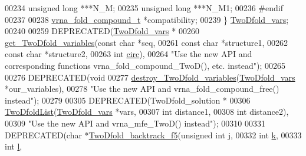 \begin{DoxyCode}
00234   \textcolor{keywordtype}{unsigned} \textcolor{keywordtype}{long}         ***N\_M;
00235   \textcolor{keywordtype}{unsigned} \textcolor{keywordtype}{long}         ***N\_M1;
00236 \textcolor{preprocessor}{#endif}
00237 
00238   \hyperlink{group__fold__compound_structvrna__fc__s}{vrna\_fold\_compound\_t}  *compatibility;
00239 \} \hyperlink{group__kl__neighborhood__mfe_gaf4f514010a14f9d59d850742b3e96954}{TwoDfold\_vars};
00240 
00259 DEPRECATED(\hyperlink{group__kl__neighborhood__mfe_structTwoDfold__vars}{TwoDfold\_vars} *
00260            \hyperlink{group__kl__neighborhood__mfe_gac9284f132cf0eaa0a2f43590eda05488}{get\_TwoDfold\_variables}(\textcolor{keyword}{const} \textcolor{keywordtype}{char}  *seq,
00261                                   \textcolor{keyword}{const} \textcolor{keywordtype}{char}  *structure1,
00262                                   \textcolor{keyword}{const} \textcolor{keywordtype}{char}  *structure2,
00263                                   \textcolor{keywordtype}{int}         \hyperlink{group__model__details_gaf9202a1a09f5828dc731e2d9a10fa111}{circ}),
00264            \textcolor{stringliteral}{"Use the new API and corresponding functions vrna\_fold\_compound\_TwoD(), etc. instead"});
00265 
00276 DEPRECATED(\textcolor{keywordtype}{void}
00277            \hyperlink{group__kl__neighborhood__mfe_ga05bf4f31d216b1b160fd2d3d68e9b487}{destroy\_TwoDfold\_variables}(\hyperlink{group__kl__neighborhood__mfe_structTwoDfold__vars}{TwoDfold\_vars} *our\_variables),
00278            \textcolor{stringliteral}{"Use the new API and vrna\_fold\_compound\_free() instead"});
00279 
00305 DEPRECATED(TwoDfold\_solution *
00306            \hyperlink{group__kl__neighborhood__mfe_ga7fc5e3e92fe97914ca4eccd33c01c2a7}{TwoDfoldList}(\hyperlink{group__kl__neighborhood__mfe_structTwoDfold__vars}{TwoDfold\_vars} *vars,
00307                         \textcolor{keywordtype}{int}           distance1,
00308                         \textcolor{keywordtype}{int}           distance2),
00309           \textcolor{stringliteral}{"Use the new API and vrna\_mfe\_TwoD() instead"});
00310 
00331 DEPRECATED(\textcolor{keywordtype}{char} *\hyperlink{group__kl__neighborhood__mfe_gaf4dc05bf8fc1ea53acd7aeb798ba80c2}{TwoDfold\_backtrack\_f5}(\textcolor{keywordtype}{unsigned} \textcolor{keywordtype}{int}   j,
00332                                        \textcolor{keywordtype}{int}            \hyperlink{group__kl__neighborhood__mfe_ac111e850bb3b3a11b6b5707912cfa1b8}{k},
00333                                        \textcolor{keywordtype}{int}            \hyperlink{group__kl__neighborhood__mfe_ab8e95cd920901175a2cc8de726ab1d36}{l},

\end{DoxyCode}
